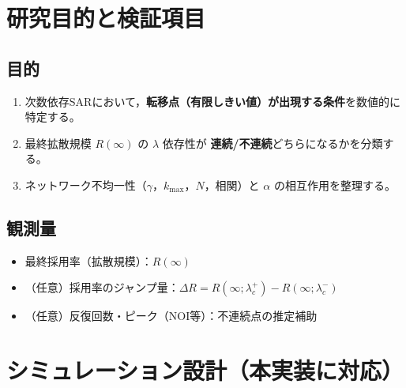 \documentclass[uplatex,dvipdfmx,11pt]{bxjsarticle}
\begin{document}
\section{研究目的と検証項目}
\subsection{目的}
\begin{enumerate}[leftmargin=2em]
  \item 次数依存SARにおいて，\textbf{転移点（有限しきい値）が出現する条件}を数値的に特定する。
  \item 最終拡散規模 $R(\infty)$ の $\lambda$ 依存性が \textbf{連続/不連続}どちらになるかを分類する。
  \item ネットワーク不均一性（$\gamma$，$k_{\max}$，$N$，相関）と $\alpha$ の相互作用を整理する。
\end{enumerate}

\subsection{観測量}
\begin{itemize}[leftmargin=2em]
  \item 最終採用率（拡散規模）：$R(\infty)$
  \item （任意）採用率のジャンプ量：$\Delta R = R(\infty;\lambda_c^+)-R(\infty;\lambda_c^-)$
  \item （任意）反復回数・ピーク（NOI等）：不連続点の推定補助
\end{itemize}

\section{シミュレーション設計（本実装に対応）}
\end{document}

